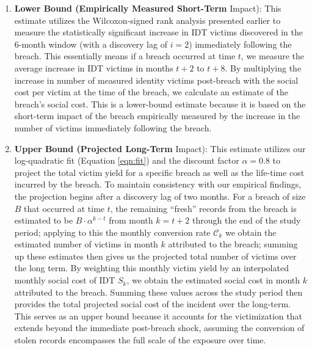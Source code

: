 \begin{enumerate}[label=(\alph*)]
\item \textbf{Lower Bound (Empirically Measured Short-Term} Impact): This estimate utilizes the Wilcoxon-signed rank analysis presented earlier to measure the statistically significant increase in IDT victims discovered in the 6-month window (with a discovery lag of $i=2$) immediately following the breach. This essentially means if a breach occurred at time $t$, we measure the average increase in IDT victims in months $t+2$ to $t+8$.
By multiplying the increase in number of measured identity victims post-breach with the social cost per victim at the time of the breach, we calculate an estimate of the breach's social cost. This is a lower-bound estimate because it is based on the short-term impact of the breach empirically measured by the increase in the number of victims immediately following the breach. 

\item \textbf{Upper Bound (Projected Long-Term} Impact): This estimate utilizes our log-quadratic fit (Equation \ref{eqn:fit}) and the discount factor $\alpha = 0.8$ to project the total victim yield for a specific breach as well as the life-time cost incurred by the breach. To maintain consistency with our empirical findings, the projection begins after a discovery lag of two months. For a breach of size $B$ that occurred at time $t$, the remaining ``fresh'' records from the breach is estimated to be $B \cdot \alpha^{k-t}$ from month $k=t+2$ through the end of the study period; applying to this the monthly conversion rate $\mathcal{C}_k$ we obtain the estimated number of victims in month $k$ attributed to the breach; summing up these estimates then gives us the projected total number of victims over the long term. By weighting this monthly victim yield by an interpolated monthly social cost of IDT $S_k$, we obtain the estimated social cost in month $k$ attributed to the breach. Summing these values across the study period then provides the total projected social cost of the incident over the long-term. 
%
This serves as an upper bound because it accounts for the victimization that extends beyond the immediate post-breach shock, assuming the conversion of stolen records encompasses the full scale of the exposure over time.




\end{enumerate}
